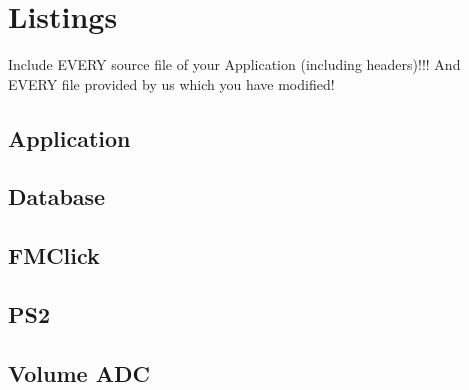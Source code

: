 \section{Listings}
\small{

Include EVERY source file of your Application (including headers)!!!
And EVERY file provided by us which you have modified!

\subsection{Application}




\subsection{Database}







\subsection{FMClick}







\subsection{PS2}






\subsection{Volume ADC}




}%
